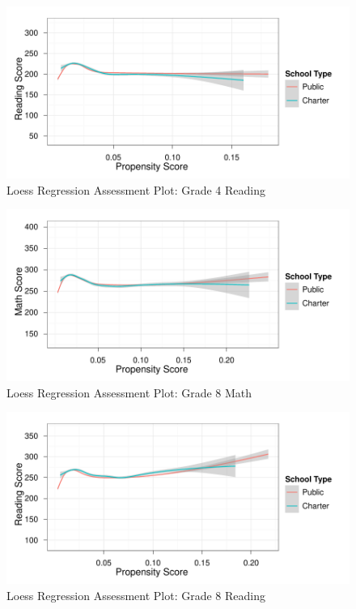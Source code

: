 \documentclass[letterpaper,12p,twoside]{article} %
\begin{document}
\begin{figure}[tp]
\begin{center}
\includegraphics[width=\textwidth]{../Figures/g4readingloess.pdf}
\caption{Loess Regression Assessment Plot: Grade 4 Reading}
\label{fig:g4reading:loess}
\end{center}
\end{figure}

\begin{figure}[tp]
\begin{center}
\includegraphics[width=\textwidth]{../Figures/g8mathloess.pdf}
\caption{Loess Regression Assessment Plot: Grade 8 Math}
\label{fig:g8math:loess}
\end{center}
\end{figure}

\begin{figure}[tp]
\begin{center}
\includegraphics[width=\textwidth]{../Figures/g8readingloess.pdf}
\caption{Loess Regression Assessment Plot: Grade 8 Reading}
\label{fig:g8reading:loess}
\end{center}
\end{figure}
\end{document}

